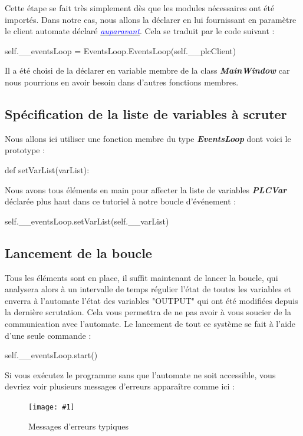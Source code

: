 \documentclass[12pt]{report}    %
\newcommand{\iImage}[3]{\begin{figure}[H]\centering\texttt{[image: \#1]}\caption{#2}\end{figure}}
\newcommand{\italic}[1]{{\itshape #1}}
\newcommand{\ib}[1]{{\bfseries\itshape #1}}
\newcommand{\smallSkip}{\vskip 0.5cm}
\newcommand{\lref}[2]{\hyperref[#1]{\textcolor{blue}{\italic{#2}}}}
\newcommand{\rootIm}{images/ENIBSupervision/}
\begin{document}
Cette étape se fait très simplement dès que les modules nécessaires ont été importés. Dans notre cas, nous allons la déclarer en lui fournissant en paramètre le client automate déclaré \lref{tag-plc-declaration}{auparavant}. Cela se traduit par le code suivant :
\begin{pyCode}
self.__eventsLoop = EventsLoop.EventsLoop(self.__plcClient)
\end{pyCode}
Il a été choisi de la déclarer en variable membre de la class \ib{MainWindow} car nous pourrions en avoir besoin dans d'autres fonctions membres.

\subsection{Spécification de la liste de variables à scruter}

Nous allons ici utiliser une fonction membre du type \ib{EventsLoop} dont voici le prototype :
\begin{pyCode}
def setVarList(varList):
\end{pyCode}
Nous avons tous éléments en main pour affecter la liste de variables \ib{PLCVar} déclarée plus haut dans ce tutoriel à notre boucle d'événement :
\begin{pyCode}
self.__eventsLoop.setVarList(self.__varList)
\end{pyCode}

\subsection{Lancement de la boucle}

Tous les éléments sont en place, il suffit maintenant de lancer la boucle, qui analysera alors à un intervalle de temps régulier l'état de toutes les variables et enverra à l'automate l'état des variables "OUTPUT" qui ont été modifiées depuis la dernière scrutation.\newline
Cela vous permettra de ne pas avoir à vous soucier de la communication avec l'automate.\newline
Le lancement de tout ce système se fait à l'aide d'une seule commande :
\begin{pyCode}
self.__eventsLoop.start()
\end{pyCode}
\smallSkip

Si vous exécutez le programme sans que l'automate ne soit accessible, vous devriez voir plusieurs messages d'erreurs apparaître comme ici :

\iImage{\rootIm enibSup_error_cannotConnectToPLC.png}{Messages d'erreurs typiques}{0.3}
\end{document}
